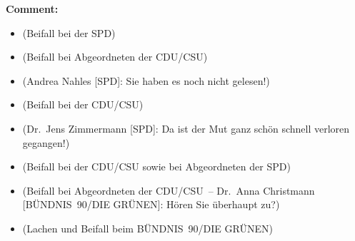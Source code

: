 \documentclass{article}
\begin{document}
\noindent\textbf{Comment:}
\begin{itemize}
    \setlength\itemsep{-3pt}
    \item (Beifall bei der SPD)
    \setlength\itemsep{-3pt}
    \item (Beifall bei Abgeordneten der CDU/CSU)
    \setlength\itemsep{-3pt}
    \item (Andrea Nahles [SPD]: Sie haben es noch nicht gelesen!)
    \setlength\itemsep{-3pt}
    \item (Beifall bei der CDU/CSU)
    \setlength\itemsep{-3pt}
    \item (Dr. Jens Zimmermann [SPD]: Da ist der Mut ganz schön schnell verloren gegangen!)
    \setlength\itemsep{-3pt}
    \item (Beifall bei der CDU/CSU sowie bei Abgeordneten der SPD)
    \setlength\itemsep{-3pt}
    \item (Beifall bei Abgeordneten der CDU/CSU – Dr. Anna Christmann [BÜNDNIS 90/DIE GRÜNEN]: Hören Sie überhaupt zu?)
    \setlength\itemsep{-3pt}
    \item (Lachen und Beifall beim BÜNDNIS 90/DIE GRÜNEN)
\end{itemize}
\end{document}
